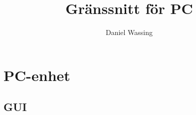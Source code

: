 \documentclass[10pt,a4paper]{article}
\title{Gränssnitt för PC}
\author{Daniel Wassing}
\begin{document}
\section{PC-enhet}
	\subsection{GUI}

	\centerline{}

	
\end{document}
